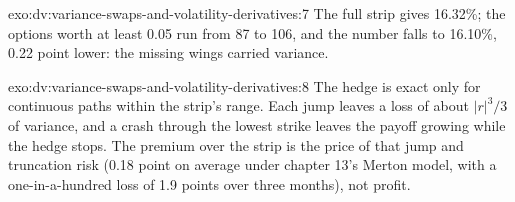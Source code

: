 \begin{solution}{exo:dv:variance-swaps-and-volatility-derivatives:7}
The full strip gives 16.32\%; the options worth at least 0.05 run from 87 to 106, and the number falls to 16.10\%,
0.22 point lower: the missing wings carried variance.
\end{solution}

\begin{solution}{exo:dv:variance-swaps-and-volatility-derivatives:8}
The hedge is exact only for continuous paths within the strip's range. Each jump leaves a loss of about
$|r|^3/3$ of variance, and a crash through the lowest strike leaves the payoff growing while the hedge stops. The
premium over the strip is the price of that jump and truncation risk (0.18 point on average under chapter 13's
Merton model, with a one-in-a-hundred loss of 1.9 points over three months), not profit.
\end{solution}

